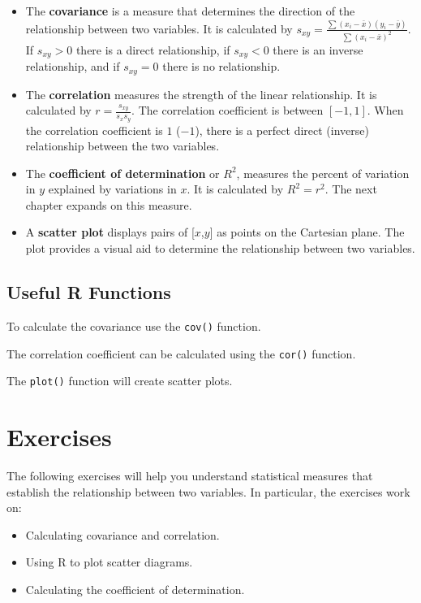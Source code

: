 \documentclass[
  letterpaper,
  DIV=11,
  numbers=noendperiod]{scrreprt}
\begin{document}
\begin{itemize}
\item
  The \textbf{covariance} is a measure that determines the direction of
  the relationship between two variables. It is calculated by
  \(s_{xy}=\frac {\sum(x_i-\bar{x})(y_i-\bar{y})}{\sum (x_i-\bar{x})^2}\).
  If \(s_{xy}>0\) there is a direct relationship, if \(s_{xy}<0\) there
  is an inverse relationship, and if \(s_{xy}=0\) there is no
  relationship.
\item
  The \textbf{correlation} measures the strength of the linear
  relationship. It is calculated by \(r= \frac {s_{xy}}{s_x s_y}\). The
  correlation coefficient is between \([-1,1]\). When the correlation
  coefficient is \(1\) (\(-1\)), there is a perfect direct (inverse)
  relationship between the two variables.
\item
  The \textbf{coefficient of determination} or \(R^2\), measures the
  percent of variation in \(y\) explained by variations in \(x\). It is
  calculated by \(R^2=r^2\). The next chapter expands on this measure.
\item
  A \textbf{scatter plot} displays pairs of {[}\(x\),\(y\){]} as points
  on the Cartesian plane. The plot provides a visual aid to determine
  the relationship between two variables.
\end{itemize}

\hypertarget{useful-r-functions-5}{%
\subsection*{Useful R Functions}\label{useful-r-functions-5}}

To calculate the covariance use the \texttt{cov()} function.

The correlation coefficient can be calculated using the \texttt{cor()}
function.

The \texttt{plot()} function will create scatter plots.

\hypertarget{exercises-5}{%
\section{Exercises}\label{exercises-5}}

The following exercises will help you understand statistical measures
that establish the relationship between two variables. In particular,
the exercises work on:

\begin{itemize}
\item
  Calculating covariance and correlation.
\item
  Using R to plot scatter diagrams.
\item
  Calculating the coefficient of determination.
\end{itemize}
\end{document}
